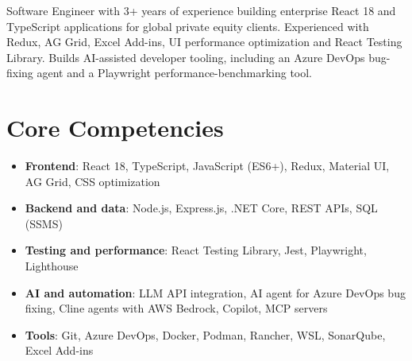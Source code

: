 \documentclass[11pt,a4paper,sans]{moderncv}
\begin{document}
\makecvtitle


\vspace{6pt}
\small{Software Engineer with 3+ years of experience building enterprise React 18 and TypeScript applications for global private equity clients. Experienced with Redux, AG Grid, Excel Add-ins, UI performance optimization and React Testing Library. Builds AI-assisted developer tooling, including an Azure DevOps bug-fixing agent and a Playwright performance-benchmarking tool.}


\section{Core Competencies}
\vspace{1pt}
\begin{itemize}

\item \textbf{Frontend}: React 18, TypeScript, JavaScript (ES6+), Redux, Material UI, AG Grid, CSS optimization

\item \textbf{Backend and data}: Node.js, Express.js, .NET Core, REST APIs, SQL (SSMS)

\item \textbf{Testing and performance}: React Testing Library, Jest, Playwright, Lighthouse

\item \textbf{AI and automation}: LLM API integration, AI agent for Azure DevOps bug fixing, Cline agents with AWS Bedrock, Copilot, MCP servers

\item \textbf{Tools}: Git, Azure DevOps, Docker, Podman, Rancher, WSL, SonarQube, Excel Add-ins

\end{itemize}

\end{document}
